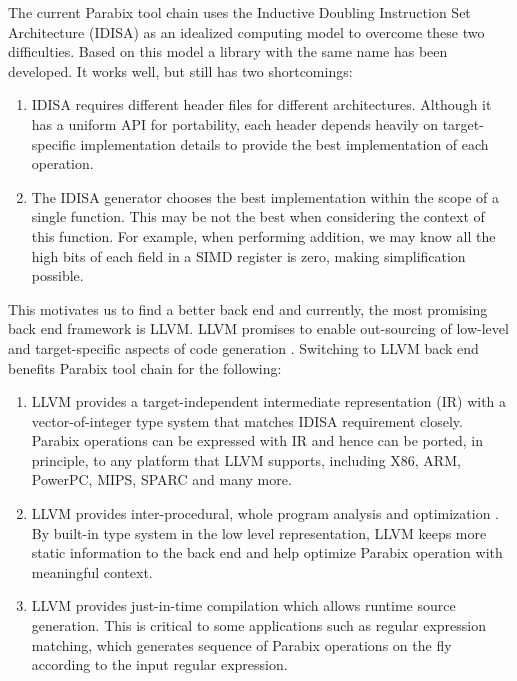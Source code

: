 The current Parabix tool chain uses the Inductive Doubling Instruction Set Architecture (IDISA) as an idealized computing model to overcome these two difficulties. Based on this model a library with the same name has been developed. It works well, but still has two shortcomings:

\begin{enumerate}
  \item IDISA requires different header files for different architectures. Although it has a uniform API for portability, each header depends heavily on target-specific implementation details to provide the best implementation of each operation.
  \item The IDISA generator \cite{hua_idisa} chooses the best implementation within the scope of a single function. This may be not the best when considering the context of this function. For example, when performing addition, we may know all the high bits of each field in a SIMD register is zero, making simplification possible.
\end{enumerate}

This motivates us to find a better back end and currently, the most promising back end framework is LLVM\@. LLVM promises to enable out-sourcing of low-level and target-specific aspects of code generation \cite{llvm_ghc, chris_msthesis}. Switching to LLVM back end benefits Parabix tool chain for the following:

\begin{enumerate}
  \item LLVM provides a target-independent intermediate representation (IR) with a vector-of-integer type system that matches IDISA requirement closely. Parabix operations can be expressed with IR and hence can be ported, in principle, to any platform that LLVM supports, including X86, ARM, PowerPC, MIPS, SPARC and many more.
  \item LLVM provides inter-procedural, whole program analysis and optimization \cite{llvm_cgo04}. By built-in type system in the low level representation, LLVM keeps more static information to the back end and help optimize Parabix operation with meaningful context.
  \item LLVM provides just-in-time compilation which allows runtime source generation. This is critical to some applications such as regular expression matching, which generates sequence of Parabix operations on the fly according to the input regular expression.
\end{enumerate}


